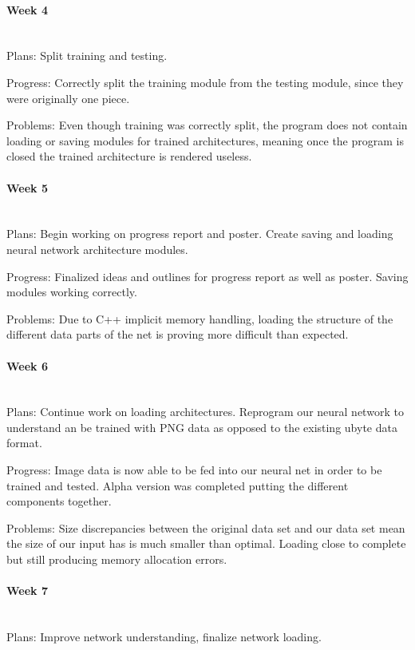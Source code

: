 \documentclass[article, onecolumn, draftclsnofoot,10pt, compsoc]{IEEEtran}
\begin{document}
\paragraph{Week 4}
\mbox{}\\
Plans: 
Split training and testing. 
 
Progress: 
Correctly split the training module from the testing module, since they were originally one piece.  
 
Problems: 
Even though training was correctly split, the program does not contain loading or saving modules for trained architectures, meaning once the program is closed the trained architecture is rendered useless.  

\paragraph{Week 5}
\mbox{}\\
Plans:  
Begin working on progress report and poster. Create saving and loading neural network architecture modules.  
 
Progress: 
Finalized ideas and outlines for progress report as well as poster. Saving modules working correctly. 
 
Problems: 
Due to C++ implicit memory handling, loading the structure of the different data parts of the net is proving more difficult than expected.

\paragraph{Week 6}
\mbox{}\\
Plans: 
Continue work on loading architectures. Reprogram our neural network to understand an be trained with PNG data as opposed to the existing ubyte data format. 
 
Progress:  
Image data is now able to be fed into our neural net in order to be trained and tested. Alpha version was completed putting the different components together. 
 
Problems: 
Size discrepancies between the original data set and our data set mean the size of our input has is much smaller than optimal. Loading close to complete but still producing memory allocation errors.  

\paragraph{Week 7}
\mbox{}\\
Plans: 
Improve network understanding, finalize network loading. 
 
\end{document}
